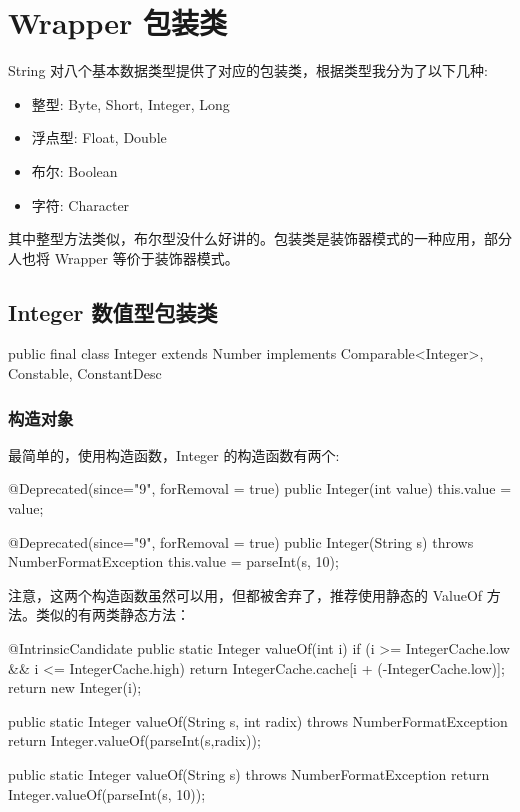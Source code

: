 \section{Wrapper 包装类}

String 对八个基本数据类型提供了对应的包装类，根据类型我分为了以下几种:

\begin{itemize}
    \item 整型: Byte, Short, Integer, Long
    \item 浮点型: Float, Double
    \item 布尔: Boolean
    \item 字符: Character
\end{itemize}

其中整型方法类似，布尔型没什么好讲的。包装类是装饰器模式的一种应用，部分人也将 Wrapper 等价于装饰器模式。

\subsection{Integer 数值型包装类}

\begin{Java}
public final class Integer extends Number 
    implements Comparable<Integer>, Constable, ConstantDesc {}
\end{Java}

\subsubsection{构造对象}

最简单的，使用构造函数，Integer 的构造函数有两个:

\begin{Java}
@Deprecated(since="9", forRemoval = true)
public Integer(int value) {
    this.value = value;
}

@Deprecated(since="9", forRemoval = true)
public Integer(String s) throws NumberFormatException {
    this.value = parseInt(s, 10);
}
\end{Java}

注意，这两个构造函数虽然可以用，但都被舍弃了，推荐使用静态的 ValueOf 方法。类似的有两类静态方法：

\begin{Java}
@IntrinsicCandidate
public static Integer valueOf(int i) {
    if (i >= IntegerCache.low && i <= IntegerCache.high)
        return IntegerCache.cache[i + (-IntegerCache.low)];
    return new Integer(i);
}

public static Integer valueOf(String s, int radix) throws NumberFormatException {
    return Integer.valueOf(parseInt(s,radix));
}

public static Integer valueOf(String s) throws NumberFormatException {
    return Integer.valueOf(parseInt(s, 10));
}
\end{Java}

